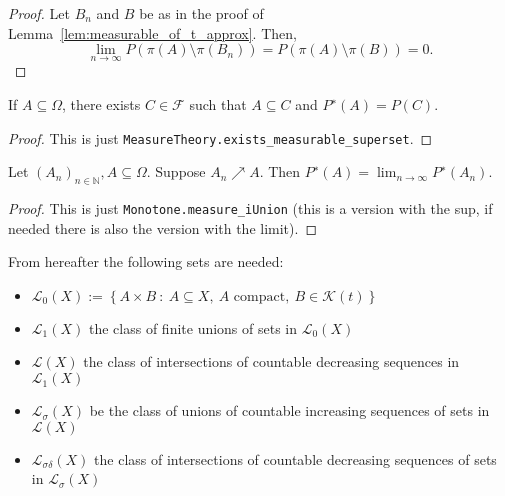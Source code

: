 \begin{proof}
  Let $B_n$ and $B$ be as in the proof of Lemma~\ref{lem:measurable_of_t_approx}.
  Then,
  $$\lim_{n \to \infty} P(\pi(A) \setminus \pi(B_n)) = P(\pi(A) \setminus \pi(B)) = 0.$$
\end{proof}

\begin{lemma}\label{lem:aux1a}
  \leanok
If $A \subseteq \Omega$, there exists $C \in \mathcal{F}$ such that $A \subseteq C$ and $P^∗(A) = P(C)$.
\end{lemma}

\begin{proof}\leanok
  This is just \verb|MeasureTheory.exists_measurable_superset|.
\end{proof}

\begin{lemma}\label{lem:aux1b}
Let $(A_n)_{n\in\mathbb{N}},A\subseteq \Omega$.
Suppose $A_n \nearrow A$. Then $P^∗(A) = \lim_{n\rightarrow \infty} P^∗(A_n)$.
\end{lemma}

\begin{proof}\leanok
  This is just \verb|Monotone.measure_iUnion| (this is a version with the sup, if needed there is also the version with the limit).
\end{proof}

\begin{definition}\label{def:L_sets}
  \leanok
  From hereafter the following sets are needed:

  \begin{itemize}
  \item $\mathcal{L}_0(X) := \left\lbrace A \times B\ :\ A \subseteq X ,\ A \text{ compact},\ B \in \mathcal{K}(t)\right\rbrace$
  \item $\mathcal{L}_1(X )$ the class of finite unions of sets in $\mathcal{L}_0(X )$
  \item $\mathcal{L} (X )$ the class of intersections of countable decreasing sequences in $\mathcal{L}_1(X )$
  \item $\mathcal{L}_\sigma(X )$ be the class of unions of countable increasing sequences of sets in $\mathcal{L} (X )$
  \item $\mathcal{L}_{\sigma\delta}(X )$ the class of intersections of countable decreasing sequences of sets in $\mathcal{L}_\sigma(X )$
  \end{itemize}
\end{definition}

